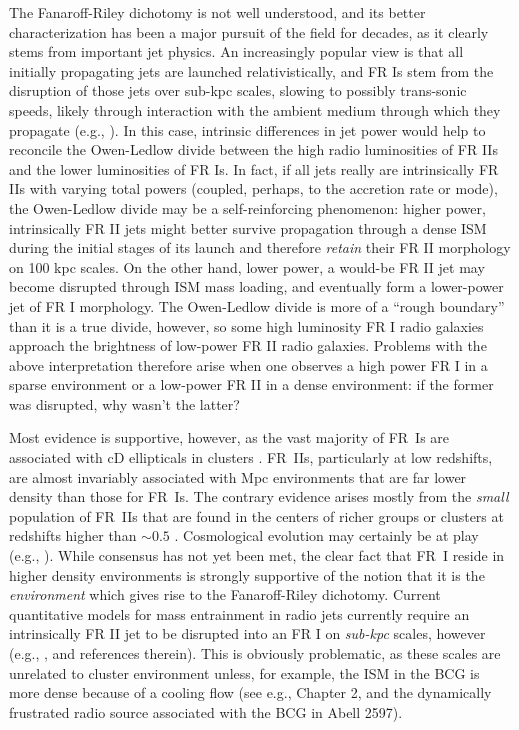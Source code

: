 The Fanaroff-Riley dichotomy is not well understood, and its better
characterization has been a major pursuit of the field for decades, as it
clearly stems from important jet physics.  An increasingly popular view is that
all initially propagating jets are launched relativistically, and FR Is stem
from the disruption of those jets over sub-kpc scales, slowing to possibly
trans-sonic speeds, likely through interaction with the ambient medium through
which they propagate (e.g., \citealt{bicknell95,laing08}).  In this case,
intrinsic differences in jet power would help to reconcile the Owen-Ledlow
divide between the high radio luminosities of FR IIs and the lower luminosities
of FR Is.  In fact, if all jets really are intrinsically FR IIs with varying
total powers (coupled, perhaps, to the accretion rate or mode), the Owen-Ledlow
divide may be a self-reinforcing phenomenon: higher power, intrinsically FR II
jets might better survive propagation through a dense ISM during the initial
stages of its launch and therefore {\it retain} their FR II morphology on 100
kpc scales. On the other hand,  lower power, a would-be FR II jet may become
disrupted through ISM mass loading, and eventually form a lower-power jet of FR
I morphology.  The Owen-Ledlow divide is more of a ``rough boundary'' than it
is a true divide, however, so some high luminosity FR I radio galaxies approach
the brightness of low-power FR II radio galaxies.  Problems with the above
interpretation therefore arise when one observes a high power FR I in a sparse
environment or a low-power FR II in a dense environment: if the former was
disrupted, why wasn't the latter?


Most evidence is supportive, however, as the vast majority of FR~Is are associated with cD ellipticals in clusters \citep[see e.g.][for  a review]{owen96}. 
FR~IIs, particularly at low redshifts, are almost invariably associated with Mpc environments 
that are far lower density than those for FR~Is. The contrary evidence 
arises mostly from the {\it small} population of FR~IIs that are found in the centers of 
richer groups or clusters at redshifts higher than $\sim 0.5$ \citep{zirbel97}.
Cosmological evolution may certainly be at play (e.g., \citealt{sadler07}). 
While consensus has not yet been met, the clear fact that FR~I reside in higher density environments 
is strongly supportive of the notion that it is the {\it environment} which 
gives rise to the Fanaroff-Riley dichotomy. Current quantitative models for mass entrainment 
in radio jets currently require an intrinsically FR II jet to be disrupted into an FR I 
on {\it sub-kpc} scales, however (e.g., \citealt{laing08}, and references therein). This is obviously problematic, as these scales 
are unrelated to cluster environment unless, for example, the ISM in the BCG is more dense because of a cooling flow (see e.g., Chapter 2, 
and the dynamically frustrated radio source associated with the BCG in Abell 2597). 


